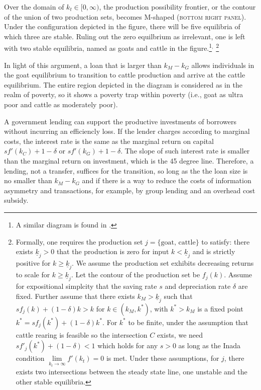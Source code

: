 	Over the domain of $k_{t}\in[0, \infty)$, the production possibility frontier, or the contour of the union of two production sets, becomes M-shaped (\textsc{bottom right panel}). Under the configuration depicted in the figure, there will be five equilibria of which three are stable. Ruling out the zero equilbrium as irrelevant, one is left with two stable equilibria, named as goats and cattle in the figure.\footnote{A similar diagram is found in \citet[][Figure 3, with $k-y$ space]{KraayMcKenzie2014}. }$^{,}$ \footnote{Formally, one requires the production set $j=\{\mbox{goat, cattle}\}$ to satisfy: there exists $\underline{k}_{j}>0$ that the production is zero for input $k<\underline{k}_{j}$ and is strictly positive for $k\geqslant\underline{k}_{j}$. We assume the production set exhibits decreasing returns to scale for $k\geqslant\underline{k}_{j}$. Let the contour of the production set be $f_{j}(k)$. Assume for expositional simplcity that the saving rate $s$ and depreciation rate $\delta$ are fixed. Further assume that there exists $k_{M}>\underline{k}_{j}$ such that $sf_{j}(k)+(1-\delta)k>k$ for $k\in(k_{M}, k^{*})$, with $k^{*}>k_{M}$ is a fixed point $k^{*}=sf_{j}(k^{*})+(1-\delta)k^{*}$. For $k^{*}$ to be finite, under the assumption that cattle rearing is feasible so the intersection $C$ exists, we need $sf'_{j}(k^{*})+(1-\delta)<1$ which holds for any $s>0$ as long as the Inada condition $\lim\limits_{k_{t}\rightarrow \infty} f'(k_{t})=0$ is met. Under these assumptions, for $j$, there exists two intersections between the steady state line, one unstable and the other stable equilibria. }%

	In light of this argument, a loan that is larger than $k_{M}-k_{G}$ allows individuals in the goat equilibrium to transition to cattle production and arrive at the cattle equilibrium. The entire region depicted in the diagram is considered as in the realm of poverty, so it shows a poverty trap within poverty (i.e., goat as ultra poor and cattle as moderately poor). 

	A government lending can support the productive investments of borrowers without incurring an efficiencly loss. If the lender charges according to marginal costs, the interest rate is the same as the marginal return on capital $sf'(k_{C})+1-\delta$ or $sf'(k_{G})+1-\delta$. The slope of such interest rate is smaller than the marginal return on investment, which is the 45 degree line. Therefore, a lending, not a transfer, suffices for the transition, so long as the the loan size is no smaller than $k_{M}-k_{G}$ and if there is a way to reduce the costs of information asymmetry and transactions, for example, by group lending and an overhead cost subsidy.

